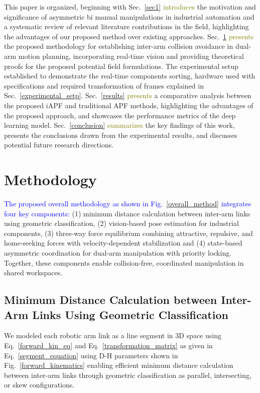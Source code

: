 \documentclass[utf8]{FrontiersinHarvard}
\begin{document}
This paper is organized, beginning with Sec.~\ref{sec1} \textcolor{olive}{introduces} the motivation and significance of asymmetric bi manual manipulations in industrial automation and a systematic review of relevant literature contributions in the field, highlighting the advantages of our proposed method over existing approaches. Sec.~\ref{method} \textcolor{olive}{presents} the proposed methodology for establishing inter-arm collision avoidance in dual-arm motion planning, incorporating real-time vision and providing theoretical proofs for the proposed potential field formulations. The experimental setup established to demonstrate the real-time components sorting, hardware used with specifications and required transformation of frames explained in Sec.~\ref{experimental_setp}. Sec.~\ref{results} \textcolor{olive}{presents} a comparative analysis between the proposed iAPF and traditional APF methods, highlighting the advantages of the proposed approach, and showcases the performance metrics of the deep learning model. Sec.~\ref{conclusion} \textcolor{olive}{summarizes} the key findings of this work, presents the conclusions drawn from the experimental results, and discusses potential future research directions.

\section{Methodology}
\label{method}
\textcolor{blue}{The proposed overall methodology as shown in Fig.~\ref{overall_method} integrates four key components:} (1) minimum distance calculation between inter-arm links using geometric classification, (2)  vision-based pose estimation for industrial components, (3) three-way force equilibrium combining attractive, repulsive, and home-seeking forces with velocity-dependent stabilization and (4) state-based asymmetric coordination for dual-arm manipulation with priority locking. Together, these components enable collision-free, coordinated manipulation in shared workspaces.

\subsection{Minimum Distance Calculation between Inter-Arm Links Using Geometric Classification}
\label{minimum_dist}
We modeled each robotic arm link as a line segment in 3D space using Eq.~\ref{forward_kin_eq} and Eq.~\ref{transformation_matrix} as given in Eq.~\ref{segment_equation} using D-H parameters shown in Fig.~\ref{forward_kinematics} enabling efficient minimum distance calculation between inter-arm links through geometric classification as parallel, intersecting, or skew configurations.
\end{document}
